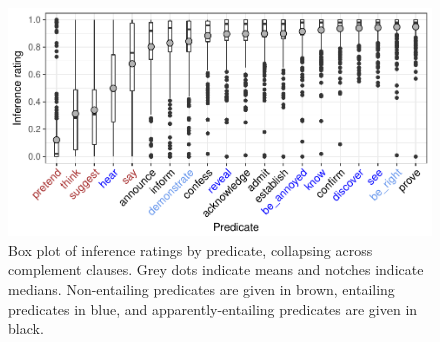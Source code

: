 \documentclass[11pt,fleqn]{article}
\newcommand{\6}{\mbox{$[\hspace*{-.6mm}[$}}
\newcommand{\9}{\mbox{$]\hspace*{-.6mm}]$}}
\begin{document}

\begin{figure}[h!]
\centering

\includegraphics[width=.75\paperwidth]{../results/4-veridicality3/graphs/boxplot-inference}

\caption{Box plot of inference ratings by predicate, collapsing across complement clauses. Grey dots indicate means and notches indicate medians. Non-entailing predicates are given in brown, entailing predicates in blue, and apparently-entailing predicates are given in black.}
\label{f-veridicality-predicate2}
\end{figure}
\end{document}
